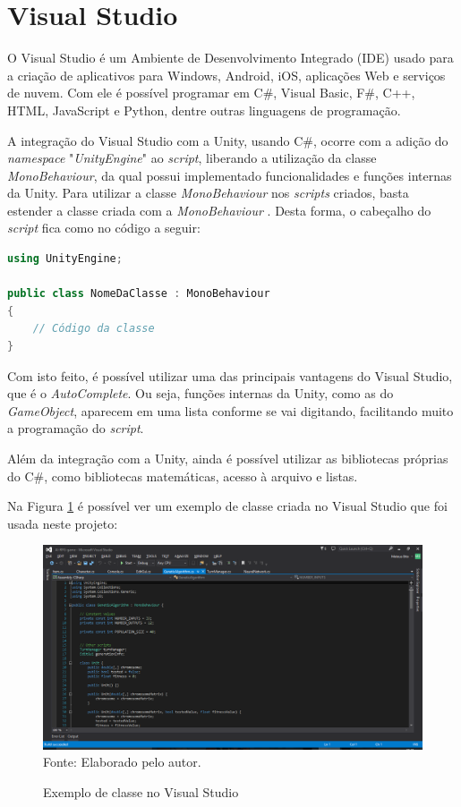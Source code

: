 \documentclass[
	12pt,					%
	openright,				%
	oneside,				%
	a4paper,				%
	bibjustif,				%
	chapter=TITLE,			%
	english,				%
	brazil,					%
	]{abntex2}
\newcommand{\source}[1]{\small Fonte: {#1}}
\begin{document}
	\FloatBarrier
	\section{Visual Studio}
		O Visual Studio é um Ambiente de Desenvolvimento Integrado (IDE) usado para a criação de aplicativos para Windows, Android, iOS, aplicações Web e serviços de nuvem.
		Com ele é possível programar em C\#, Visual Basic, F\#, C++, HTML, JavaScript e Python, dentre outras linguagens de programação. \cite{microsoft}
		
		A integração do Visual Studio com a Unity, usando C\#, ocorre com a adição do \textit{namespace} "\textit{UnityEngine}"{} ao \textit{script},
		liberando a utilização da classe \textit{MonoBehaviour},
		da qual possui implementado funcionalidades e funções internas da Unity.
		Para utilizar a classe \textit{MonoBehaviour} nos \textit{scripts} criados,
		basta estender a classe criada com a \textit{MonoBehaviour} \cite{unityScripts}.
		Desta forma, o cabeçalho do \textit{script} fica como no código a seguir:
		
		\begin{lstlisting}[language=C++]
using UnityEngine;

public class NomeDaClasse : MonoBehaviour
{
	// Código da classe
}\end{lstlisting}
		
		Com isto feito, é possível utilizar uma das principais vantagens do Visual Studio,
		que é o \textit{AutoComplete}.
		Ou seja, funções internas da Unity, como as do \textit{GameObject}, aparecem em uma lista conforme se vai digitando,
		facilitando muito a programação do \textit{script}.
		
		Além da integração com a Unity,
		ainda é possível utilizar as bibliotecas próprias do C\#,
		como bibliotecas matemáticas, acesso à arquivo e listas.
		
		Na Figura \ref{fig:exvs} é possível ver um exemplo de classe criada no Visual Studio que foi usada neste projeto:
		
		\begin{figure}[ht!]
			\caption{Exemplo de classe no Visual Studio}
			\centering
			\includegraphics[scale=0.4]{img/InterfaceVisualStudio.png}\\
			\vspace{0.5mm}
			\source{Elaborado pelo autor.}
			\label{fig:exvs}
		\end{figure}
		
\end{document}
